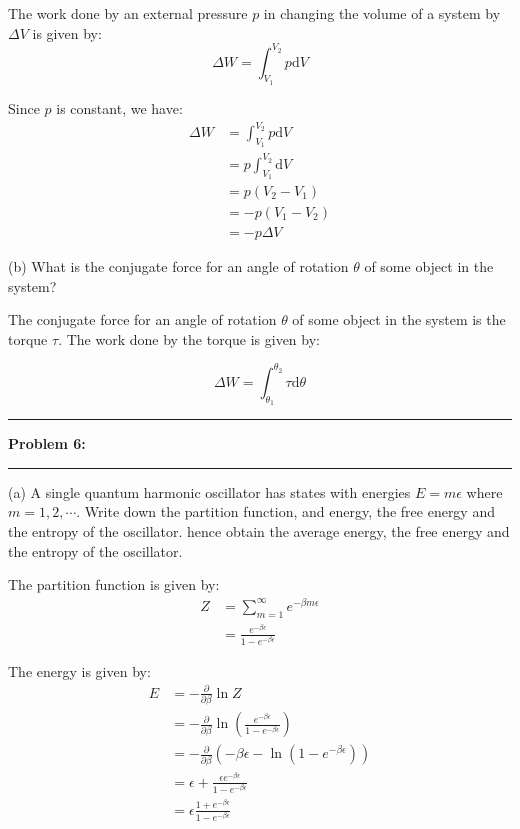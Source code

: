 \documentclass[11pt]{article}
\newcommand\question[2]{\vspace{.25in}\hrule\textbf{#1: #2}\vspace{.5em}\hrule\vspace{.10in}}
\begin{document}
\solution

The work done by an external pressure $p$ in changing the volume of a system by $\Delta V$ is given by:
\begin{equation}
    \Delta W = \int_{V_1}^{V_2}p\mathrm{d}V
\end{equation}

Since $p$ is constant, we have:
\begin{align*}
    \Delta W &= \int_{V_1}^{V_2}p\mathrm{d}V\\
             &= p\int_{V_1}^{V_2}\mathrm{d}V\\
             &= p(V_2-V_1)\\
             &= -p(V_1-V_2)\\
             &= -p\Delta V
\end{align*}

(b) What is the conjugate force for an angle of rotation $\theta$ of some object in the system?

\solution

The conjugate force for an angle of rotation $\theta$ of some object in the system is the torque $\tau$. The work done by the torque is given by:

\begin{equation}
    \Delta W = \int_{\theta_1}^{\theta_2}\tau\mathrm{d}\theta
\end{equation}

\question{Problem 6}{}
(a) A single quantum harmonic oscillator has states with energies $E = m\epsilon$ where $m=1,2,\cdots$. Write down the partition function, and energy, the free energy and the entropy of the oscillator.
hence obtain the average energy, the free energy and the entropy of the oscillator.

\solution

The partition function is given by:
\begin{align*}
    Z &= \sum_{m=1}^\infty e^{-\beta m\epsilon}\\
      &= \frac{e^{-\beta\epsilon}}{1-e^{-\beta\epsilon}}
\end{align*}

The energy is given by:
\begin{align*}
    E &= -\frac{\partial}{\partial\beta}\ln Z\\
      &= -\frac{\partial}{\partial\beta}\ln\left(\frac{e^{-\beta\epsilon}}{1-e^{-\beta\epsilon}}\right)\\
      &= -\frac{\partial}{\partial\beta}\left(-\beta\epsilon-\ln(1-e^{-\beta\epsilon})\right)\\
      &= \epsilon+\frac{\epsilon e^{-\beta\epsilon}}{1-e^{-\beta\epsilon}}\\
      &= \epsilon\frac{1+e^{-\beta\epsilon}}{1-e^{-\beta\epsilon}}
\end{align*}
\end{document}
